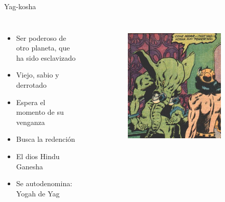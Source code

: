 \begin{frame}{Yag-kosha}
\begin{columns}
\begin{itemize}
 \item Ser poderoso de otro  planeta, que ha sido esclavizado
 \item Viejo, sabio y derrotado
 \item Espera el momento de su venganza
 \item Busca la redención
 \item El dios Hindu Ganesha
 \item Se autodenomina: Yogah de Yag
\end{itemize}
\begin{figure}[htp]
 \centering
 \begin{subfigure}[b]{0.32\textwidth}
   \includegraphics[width=\textwidth]{img/yogh/CTB}
 \end{subfigure}
~
 \begin{subfigure}[b]{0.32\textwidth}

\end{subfigure}
\end{figure}
\end{columns}
\end{frame}
